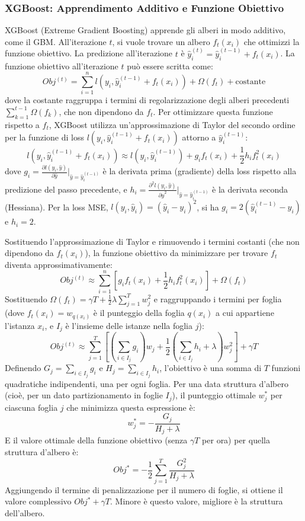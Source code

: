 \documentclass{article}
\begin{document}
\subsubsection{XGBoost: Apprendimento Additivo e Funzione Obiettivo}
XGBoost (Extreme Gradient Boosting) apprende gli alberi in modo additivo, come il GBM. All'iterazione $t$, si vuole trovare un albero $f_t(x_i)$ che ottimizzi la funzione obiettivo. La predizione all'iterazione $t$ è $\hat{y}_i^{(t)} = \hat{y}_i^{(t-1)} + f_t(x_i)$. La funzione obiettivo all'iterazione $t$ può essere scritta come:
$$ Obj^{(t)} = \sum_{i=1}^{n} l(y_i, \hat{y}_i^{(t-1)} + f_t(x_i)) + \Omega(f_t) + \text{costante} $$
dove la costante raggruppa i termini di regolarizzazione degli alberi precedenti $\sum_{k=1}^{t-1} \Omega(f_k)$, che non dipendono da $f_t$.
Per ottimizzare questa funzione rispetto a $f_t$, XGBoost utilizza un'approssimazione di Taylor del secondo ordine per la funzione di loss $l(y_i, \hat{y}_i^{(t-1)} + f_t(x_i))$ attorno a $\hat{y}_i^{(t-1)}$:
$$ l(y_i, \hat{y}_i^{(t-1)} + f_t(x_i)) \approx l(y_i, \hat{y}_i^{(t-1)}) + g_i f_t(x_i) + \frac{1}{2} h_i f_t^2(x_i) $$
dove $g_i = \frac{\partial l(y_i, \hat{y})}{\partial \hat{y}} \Big|_{\hat{y}=\hat{y}_i^{(t-1)}}$ è la derivata prima (gradiente) della loss rispetto alla predizione del passo precedente, e $h_i = \frac{\partial^2 l(y_i, \hat{y})}{\partial \hat{y}^2} \Big|_{\hat{y}=\hat{y}_i^{(t-1)}}$ è la derivata seconda (Hessiana).
Per la loss MSE, $l(y_i, \hat{y}_i) = (\hat{y}_i - y_i)^2$, si ha $g_i = 2(\hat{y}_i^{(t-1)} - y_i)$ e $h_i = 2$.

Sostituendo l'approssimazione di Taylor e rimuovendo i termini costanti (che non dipendono da $f_t(x_i)$), la funzione obiettivo da minimizzare per trovare $f_t$ diventa approssimativamente:
$$ Obj^{(t)} \approx \sum_{i=1}^{n} [g_i f_t(x_i) + \frac{1}{2} h_i f_t^2(x_i)] + \Omega(f_t) $$
Sostituendo $\Omega(f_t) = \gamma T + \frac{1}{2} \lambda \sum_{j=1}^{T} w_j^2$ e raggruppando i termini per foglia (dove $f_t(x_i) = w_{q(x_i)}$ è il punteggio della foglia $q(x_i)$ a cui appartiene l'istanza $x_i$, e $I_j$ è l'insieme delle istanze nella foglia $j$):
$$ Obj^{(t)} \approx \sum_{j=1}^{T} \left[ \left(\sum_{i \in I_j} g_i\right) w_j + \frac{1}{2} \left(\sum_{i \in I_j} h_i + \lambda\right) w_j^2 \right] + \gamma T $$
Definendo $G_j = \sum_{i \in I_j} g_i$ e $H_j = \sum_{i \in I_j} h_i$, l'obiettivo è una somma di $T$ funzioni quadratiche indipendenti, una per ogni foglia. Per una data struttura d'albero (cioè, per un dato partizionamento in foglie $I_j$), il punteggio ottimale $w_j^*$ per ciascuna foglia $j$ che minimizza questa espressione è:
$$ w_j^* = - \frac{G_j}{H_j + \lambda} $$
E il valore ottimale della funzione obiettivo (senza $\gamma T$ per ora) per quella struttura d'albero è:
$$ Obj^* = - \frac{1}{2} \sum_{j=1}^{T} \frac{G_j^2}{H_j + \lambda} $$
Aggiungendo il termine di penalizzazione per il numero di foglie, si ottiene il valore complessivo $Obj^* + \gamma T$. Minore è questo valore, migliore è la struttura dell'albero.
\end{document}
